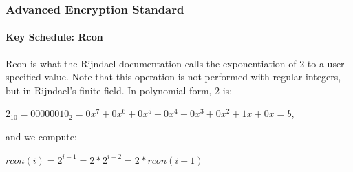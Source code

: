 \begin{frame}
	\frametitle{Advanced Encryption Standard}
		\framesubtitle{Key Schedule: Rcon}
		{\normalsize
		\hspace{0.5cm}Rcon is what the Rijndael documentation calls the exponentiation of 2 to a user-specified value. Note that this operation 	is not performed with regular integers, but in Rijndael's finite field. In polynomial form, 2 is:
		\vspace{0.2cm}
		\begin{block}{}
	$2_{10}=00000010_2=0x^7+0x^6+0x^5+0x^4+0x^3+0x^2+1x+0x=b $,\\
	\end{block}
	{and we compute:}\\
	\begin{block}{}
	$rcon(i)=2^{i-1}=2*2^{i-2}=2*rcon(i-1)$\\
	\end{block}
	}
\end{frame}

